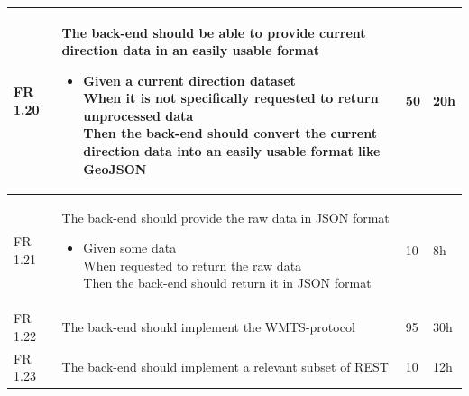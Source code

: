 \documentclass[11pt,a4paper,titlepage,oneside]{report}
\begin{document}
\begin{longtable}{p{1.4cm} p{7.8cm} p{1cm} p{1cm} }
  FR 1.20 & The back-end should be able to provide current direction data in an easily usable format
  \begin{itemize}
  \item \parbox[t]{6.8cm}{
        Given a current direction dataset \\
        When it is not specifically requested to return unprocessed data \\
        Then the back-end should convert the current direction data into an easily usable format like GeoJSON}
  \end{itemize}
  & 50 & 20h \\ \hline

  FR 1.21 & The back-end should provide the raw data in JSON format
  \begin{itemize}
  \item \parbox[t]{6.8cm}{
        Given some data \\
        When requested to return the raw data \\
        Then the back-end should return it in JSON format}
  \end{itemize}
  & 10 & 8h \\ \hline

  FR 1.22 & The back-end should implement the WMTS-protocol & 95 & 30h \\ \hline

  FR 1.23 & The back-end should implement a relevant subset of REST & 10 & 12h \\ \hline
  \end{longtable}
  
  \vspace{2cm}
\end{document}
